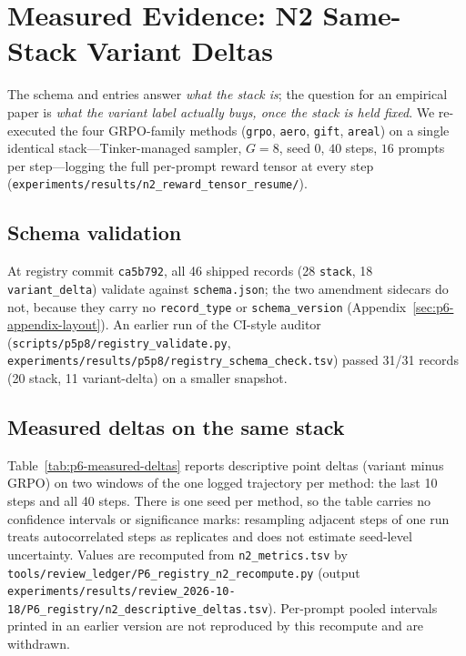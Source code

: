 \section{Measured Evidence: N2 Same-Stack Variant Deltas}
\label{sec:p6-measured}

The schema and entries answer \emph{what the stack is}; the question for an
empirical paper is \emph{what the variant label actually buys, once the
stack is held fixed}. We re-executed the four GRPO-family methods
(\texttt{grpo}, \texttt{aero}, \texttt{gift}, \texttt{areal}) on a single
identical stack---Tinker-managed sampler, $G{=}8$, seed $0$, $40$ steps,
$16$ prompts per step---logging the full per-prompt reward tensor at every
step (\texttt{experiments/results/n2\_reward\_tensor\_resume/}).

\subsection{Schema validation}
At registry commit \texttt{ca5b792}, all 46 shipped records (28 \texttt{stack},
18 \texttt{variant\_delta}) validate against \texttt{schema.json}; the two
amendment sidecars do not, because they carry no \texttt{record\_type} or
\texttt{schema\_version} (Appendix~\ref{sec:p6-appendix-layout}). An earlier
run of the CI-style auditor (\texttt{scripts/p5p8/registry\_validate.py},
\texttt{experiments/results/p5p8/registry\_schema\_check.tsv}) passed
31/31 records (20 stack, 11 variant-delta) on a smaller snapshot.

\subsection{Measured deltas on the same stack}
Table~\ref{tab:p6-measured-deltas} reports descriptive point deltas
(variant minus GRPO) on two windows of the one logged trajectory per method:
the last 10 steps and all 40 steps. There is one seed per method, so the
table carries no confidence intervals or significance marks: resampling
adjacent steps of one run treats autocorrelated steps as replicates and does
not estimate seed-level uncertainty. Values are recomputed from
\texttt{n2\_metrics.tsv} by \texttt{tools/review\_ledger/P6\_registry\_n2\_recompute.py}
(output \texttt{experiments/results/review\_2026-10-18/P6\_registry/n2\_descriptive\_deltas.tsv}).
Per-prompt pooled intervals printed in an earlier version are not reproduced
by this recompute and are withdrawn.

